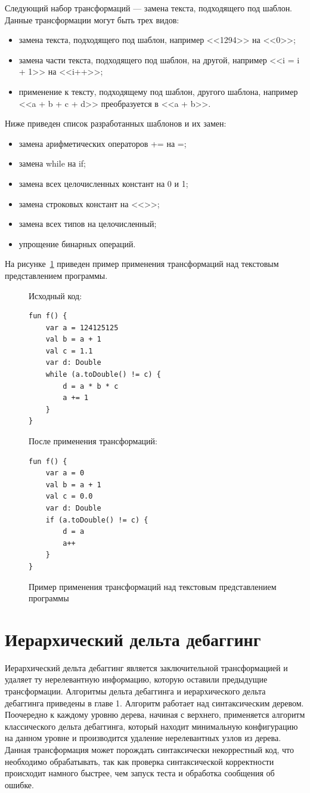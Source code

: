 Следующий набор трансформаций --- замена текста, подходящего под шаблон. Данные трансформации могут быть трех видов:
\begin{itemize}
	\item замена текста, подходящего под шаблон, например <<1294>> на <<0>>; 
	\item замена части текста, подходящего под шаблон, на другой, например <<i = i + 1>> на <<i++>>;
	\item применение к тексту, подходящему под шаблон, другого шаблона, например <<a + b + c + d>> преобразуется в <<a + b>>.
\end{itemize}
Ниже приведен список разработанных шаблонов и их замен:
\begin{itemize}
	\item замена арифметических операторов += на =;
	\item замена while на if;
	\item замена всех целочисленных констант на 0 и 1;
	\item замена строковых констант на <<>>;
	\item замена всех типов на целочисленный;
	\item упрощение бинарных операций.
\end{itemize}
На рисунке~\ref{ex:peephole} приведен пример применения трансформаций над текстовым представлением программы.
\begin{figure}
Исходный код:
\begin{lstlisting}
fun f() {
    var a = 124125125
    val b = a + 1
    val c = 1.1
    var d: Double
    while (a.toDouble() != c) {
        d = a * b * c
        a += 1
    }
}
\end{lstlisting}
После применения трансформаций:
\begin{lstlisting}
fun f() {
    var a = 0
    val b = a + 1
    val c = 0.0
    var d: Double
    if (a.toDouble() != c) {
        d = a
        a++
    }
}
\end{lstlisting}
\caption{\label{ex:peephole}Пример применения трансформаций над текстовым представлением программы}
\end{figure}


\section{Иерархический дельта дебаггинг}
Иерархический дельта дебаггинг является заключительной трансформацией и удаляет ту нерелевантную информацию, которую оставили предыдущие трансформации. Алгоритмы дельта дебаггинга и иерархического дельта дебаггинга приведены в главе 1. Алгоритм работает над синтаксическим деревом. Поочередно к каждому уровню дерева, начиная с верхнего, применяется алгоритм классического дельта дебаггинга, который находит минимальную конфигурацию на данном уровне и производится удаление нерелевантных узлов из дерева. Данная трансформация может порождать синтаксически некоррестный код, что необходимо обрабатывать, так как проверка синтаксической корректности происходит намного быстрее, чем запуск теста и обработка сообщения об ошибке.